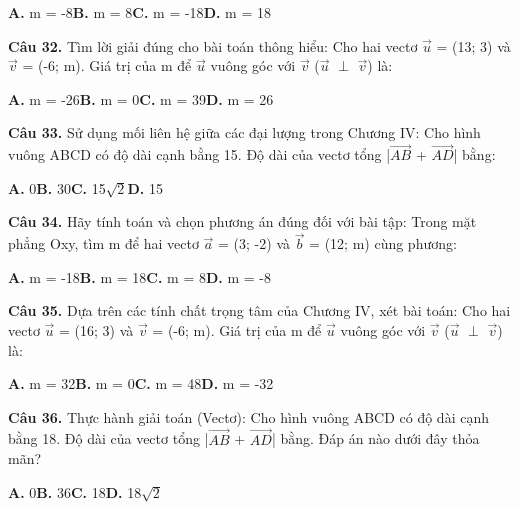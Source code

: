 \documentclass[11pt,a4paper]{article}
\begin{document}
\hspace*{1.5em}\textbf{A.} m = -8\quad\quad \textbf{B.} m = 8\quad\quad \textbf{C.} m = -18\quad\quad \textbf{D.} m = 18\par\vspace{2pt}
\textbf{\color{primary} Câu 32.} Tìm lời giải đúng cho bài toán thông hiểu: Cho hai vectơ $\vec{u}$ = (13; 3) và $\vec{v}$ = (-6; m). Giá trị của m để $\vec{u}$ vuông góc với $\vec{v}$ ($\vec{u}$ $\perp$ $\vec{v}$) là:\par
\hspace*{1.5em}\textbf{A.} m = -26\quad\quad \textbf{B.} m = 0\quad\quad \textbf{C.} m = 39\quad\quad \textbf{D.} m = 26\par\vspace{2pt}
\textbf{\color{primary} Câu 33.} Sử dụng mối liên hệ giữa các đại lượng trong Chương IV: Cho hình vuông ABCD có độ dài cạnh bằng 15. Độ dài của vectơ tổng |$\overrightarrow{AB}$ + $\overrightarrow{AD}$| bằng:\par
\hspace*{1.5em}\textbf{A.} 0\quad\quad \textbf{B.} 30\quad\quad \textbf{C.} 15$\sqrt{2}$\quad\quad \textbf{D.} 15\par\vspace{2pt}
\textbf{\color{primary} Câu 34.} Hãy tính toán và chọn phương án đúng đối với bài tập: Trong mặt phẳng Oxy, tìm m để hai vectơ $\vec{a}$ = (3; -2) và $\vec{b}$ = (12; m) cùng phương:\par
\hspace*{1.5em}\textbf{A.} m = -18\quad\quad \textbf{B.} m = 18\quad\quad \textbf{C.} m = 8\quad\quad \textbf{D.} m = -8\par\vspace{2pt}
\textbf{\color{primary} Câu 35.} Dựa trên các tính chất trọng tâm của Chương IV, xét bài toán: Cho hai vectơ $\vec{u}$ = (16; 3) và $\vec{v}$ = (-6; m). Giá trị của m để $\vec{u}$ vuông góc với $\vec{v}$ ($\vec{u}$ $\perp$ $\vec{v}$) là:\par
\hspace*{1.5em}\textbf{A.} m = 32\quad\quad \textbf{B.} m = 0\quad\quad \textbf{C.} m = 48\quad\quad \textbf{D.} m = -32\par\vspace{2pt}
\textbf{\color{primary} Câu 36.} Thực hành giải toán (Vectơ): Cho hình vuông ABCD có độ dài cạnh bằng 18. Độ dài của vectơ tổng |$\overrightarrow{AB}$ + $\overrightarrow{AD}$| bằng. Đáp án nào dưới đây thỏa mãn?\par
\hspace*{1.5em}\textbf{A.} 0\quad\quad \textbf{B.} 36\quad\quad \textbf{C.} 18\quad\quad \textbf{D.} 18$\sqrt{2}$\par\vspace{2pt}
\end{document}

